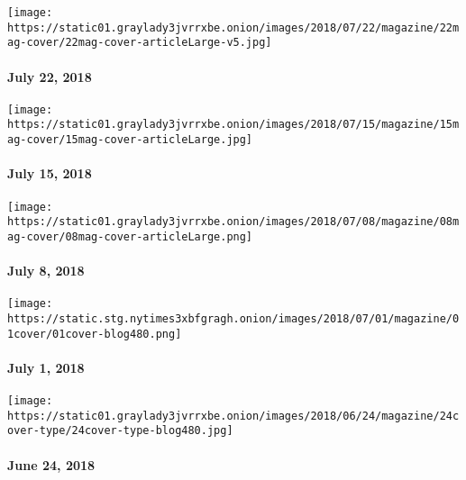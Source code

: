 \href{https://www.nytimes3xbfgragh.onion/issue/magazine/2018/07/20/the-72218-issue}{}

\texttt{[image: https://static01.graylady3jvrrxbe.onion/images/2018/07/22/magazine/22mag-cover/22mag-cover-articleLarge-v5.jpg]}

\hypertarget{july-22-2018}{%
\paragraph{July 22, 2018}\label{july-22-2018}}

\href{https://www.nytimes3xbfgragh.onion/issue/magazine/2018/07/17/the-71518-issue}{}

\texttt{[image: https://static01.graylady3jvrrxbe.onion/images/2018/07/15/magazine/15mag-cover/15mag-cover-articleLarge.jpg]}

\hypertarget{july-15-2018}{%
\paragraph{July 15, 2018}\label{july-15-2018}}

\href{https://www.nytimes3xbfgragh.onion/issue/magazine/2018/07/10/the-7818-issue}{}

\texttt{[image: https://static01.graylady3jvrrxbe.onion/images/2018/07/08/magazine/08mag-cover/08mag-cover-articleLarge.png]}

\hypertarget{july-8-2018}{%
\paragraph{July 8, 2018}\label{july-8-2018}}

\href{https://www.nytimes3xbfgragh.onion/issue/magazine/2018/06/28/the-7118-issue}{}

\texttt{[image: https://static.stg.nytimes3xbfgragh.onion/images/2018/07/01/magazine/01cover/01cover-blog480.png]}

\hypertarget{july-1-2018}{%
\paragraph{July 1, 2018}\label{july-1-2018}}

\href{https://www.nytimes3xbfgragh.onion/issue/magazine/2018/06/20/the-62418-issue}{}

\texttt{[image: https://static01.graylady3jvrrxbe.onion/images/2018/06/24/magazine/24cover-type/24cover-type-blog480.jpg]}

\hypertarget{june-24-2018}{%
\paragraph{June 24, 2018}\label{june-24-2018}}

